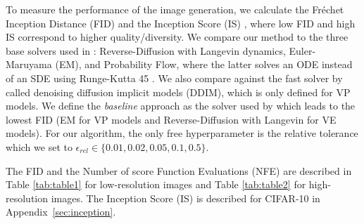 \documentclass{article}
\begin{document}
To measure the performance of the image generation, we calculate the Fréchet Inception Distance (FID) \citep{heusel2017gans} and the Inception Score (IS) \citep{salimans2016improved}, where low FID and high IS correspond to higher quality/diversity. 
We compare our method to the three base solvers used in \citet{song2020score}: Reverse-Diffusion with Langevin dynamics, Euler-Maruyama (EM), and Probability Flow, where the latter solves an ODE instead of an SDE using Runge-Kutta 45 \citep{dormand1980family}. We also compare against the fast solver by \citep{song2020denoising} called denoising diffusion implicit models (DDIM), which is only defined for VP models. We define the {\em baseline} approach as the solver used by \citet{song2020score} which leads to the lowest FID (EM for VP models and Reverse-Diffusion with Langevin for VE models). For our algorithm, the only free hyperparameter is the relative tolerance which we set to $\epsilon_{rel} \in \{0.01, 0.02, 0.05, 0.1, 0.5\}$. 

The FID and the Number of score Function Evaluations (NFE) are described in Table \ref{tab:table1} for low-resolution images and Table \ref{tab:table2} for high-resolution images. The Inception Score (IS) is described for CIFAR-10 in Appendix~\ref{sec:inception}. 
\end{document}
